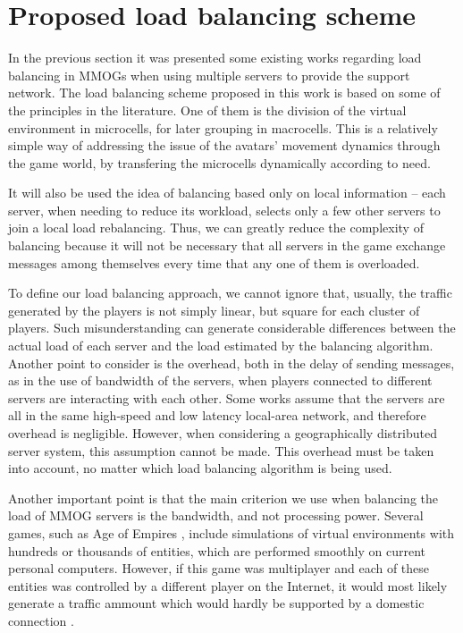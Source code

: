 \section{Proposed load balancing scheme}
\label{sec:scheme}

In the previous section it was presented some existing works regarding load balancing in MMOGs when using multiple servers to provide the support network. The load balancing scheme proposed in this work is based on some of the principles in the literature. One of them is the division of the virtual environment in microcells, for later grouping in macrocells. This is a relatively simple way of addressing the issue of the avatars' movement dynamics through the game world, by transfering the microcells dynamically according to need.

It will also be used the idea of balancing based only on local information -- each server, when needing to reduce its workload, selects only a few other servers to join a local load rebalancing. Thus, we can greatly reduce the complexity of balancing because it will not be necessary that all servers in the game exchange messages among themselves every time that any one of them is overloaded.

To define our load balancing approach, we cannot ignore that, usually, the traffic generated by the players is not simply linear, but square for each cluster of players. Such misunderstanding can generate considerable differences between the actual load of each server and the load estimated by the balancing algorithm. Another point to consider is the overhead, both in the delay of sending messages, as in the use of bandwidth of the servers, when players connected to different servers are interacting with each other. Some works assume that the servers are all in the same high-speed and low latency local-area network, and therefore overhead is negligible. However, when considering a geographically distributed server system, this assumption cannot be made. This overhead must be taken into account, no matter which load balancing algorithm is being used.

Another important point is that the main criterion we use when balancing the load of MMOG servers is the bandwidth, and not processing power. Several games, such as Age of Empires \cite{ageofempires}, include simulations of virtual environments with hundreds or thousands of entities, which are performed smoothly on current personal computers. However, if this game was multiplayer and each of these entities was controlled by a different player on the Internet, it would most likely generate a traffic ammount which would hardly be supported by a domestic connection \cite{feng2007wnn}.

